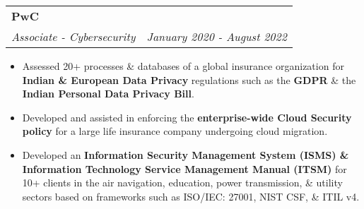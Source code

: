 \documentclass[letterpaper,11pt]{article}
\makeatletter
\newcommand{\resumeItem}[1]{
  \item\small{
    {#1 \vspace{-2pt}}
  }
}
\newcommand{\resumeSubheading}[4]{
  \vspace{-2pt}\item
    \begin{tabular*}{0.97\textwidth}[t]{l@{\extracolsep{\fill}}r}
      \textbf{#1} & #2 \\
      \textit{\small#3} & \textit{\small #4} \\
    \end{tabular*}\vspace{0pt}
}
\newcommand{\resumeItemListStart}{\begin{itemize}}
\newcommand{\resumeItemListEnd}{\end{itemize}\vspace{-5pt}}
\makeatother
\begin{document}
\resumeSubheading
      {PwC}{}
      {Associate - Cybersecurity}{January 2020 - August 2022}
      \resumeItemListStart
       \resumeItem{}
       {Assessed 20+ processes \& databases of a global insurance organization for \textbf{Indian \& European Data Privacy} regulations such as the \textbf{GDPR} \& the \textbf{Indian Personal Data Privacy Bill}.}
        \resumeItem{}
        {Developed and assisted in enforcing the \textbf{enterprise-wide Cloud Security policy} for a large life insurance company undergoing cloud migration.}
        \resumeItem{}
        {Developed an \textbf{Information Security Management System (ISMS) \& Information Technology Service Management Manual (ITSM)} for 10+ clients in the air navigation, education, power transmission, \& utility sectors based on frameworks such as ISO/IEC: 27001, NIST CSF, \& ITIL v4.}
        
      \resumeItemListEnd

    
\end{document}
